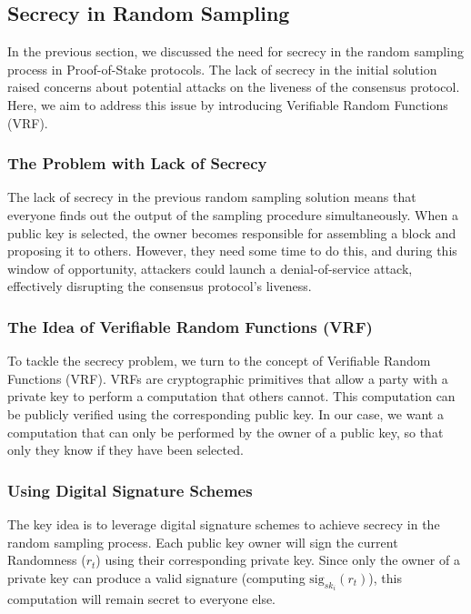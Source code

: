 \subsection{Secrecy in Random Sampling}
In the previous section, we discussed the need for secrecy in the random sampling process in Proof-of-Stake protocols. The lack of secrecy in the initial solution raised concerns about potential attacks on the liveness of the consensus protocol. Here, we aim to address this issue by introducing Verifiable Random Functions (VRF).

\subsubsection{The Problem with Lack of Secrecy}
The lack of secrecy in the previous random sampling solution means that everyone finds out the output of the sampling procedure simultaneously. When a public key is selected, the owner becomes responsible for assembling a block and proposing it to others. However, they need some time to do this, and during this window of opportunity, attackers could launch a denial-of-service attack, effectively disrupting the consensus protocol's liveness.

\subsubsection{The Idea of Verifiable Random Functions (VRF)}
To tackle the secrecy problem, we turn to the concept of Verifiable Random Functions (VRF). VRFs are cryptographic primitives that allow a party with a private key to perform a computation that others cannot. This computation can be publicly verified using the corresponding public key. In our case, we want a computation that can only be performed by the owner of a public key, so that only they know if they have been selected.

\subsubsection{Using Digital Signature Schemes}
The key idea is to leverage digital signature schemes to achieve secrecy in the random sampling process. Each public key owner will sign the current Randomness ($r_t$) using their corresponding private key. Since only the owner of a private key can produce a valid signature (computing $\text{sig}_{sk_i} (r_t)$), this computation will remain secret to everyone else.

